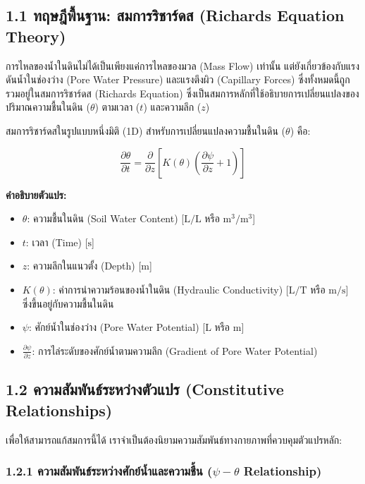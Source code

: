 \documentclass[11pt,a4paper,openany]{report}
\begin{document}
\subsection{1.1 ทฤษฎีพื้นฐาน: สมการริชาร์ดส (Richards Equation Theory)}


การไหลของน้ำในดินไม่ได้เป็นเพียงแค่การไหลของมวล (Mass Flow) เท่านั้น แต่ยังเกี่ยวข้องกับแรงดันน้ำในช่องว่าง (Pore Water Pressure) และแรงตึงผิว (Capillary Forces) ซึ่งทั้งหมดนี้ถูกรวมอยู่ในสมการริชาร์ดส (Richards Equation) ซึ่งเป็นสมการหลักที่ใช้อธิบายการเปลี่ยนแปลงของปริมาณความชื้นในดิน ($\theta$) ตามเวลา ($t$) และความลึก ($z$)

สมการริชาร์ดสในรูปแบบหนึ่งมิติ (1D) สำหรับการเปลี่ยนแปลงความชื้นในดิน ($\theta$) คือ:

$$\frac{\partial \theta}{\partial t} = \frac{\partial}{\partial z} \left[ K(\theta) \left( \frac{\partial \psi}{\partial z} + 1 \right) \right]$$


\textbf{คำอธิบายตัวแปร:}

\begin{itemize}
  \item $\theta$: ความชื้นในดิน (Soil Water Content) [$\text{L}/\text{L}$ หรือ $\text{m}^3/\text{m}^3$]
  \item $t$: เวลา (Time) [$\text{s}$]
  \item $z$: ความลึกในแนวตั้ง (Depth) [$\text{m}$]
  \item $K(\theta)$: ค่าการนำความร้อนของน้ำในดิน (Hydraulic Conductivity) [$\text{L}/\text{T}$ หรือ $\text{m}/\text{s}$] ซึ่งขึ้นอยู่กับความชื้นในดิน
  \item $\psi$: ศักย์น้ำในช่องว่าง (Pore Water Potential) [$\text{L}$ หรือ $\text{m}$]
  \item $\frac{\partial \psi}{\partial z}$: การไล่ระดับของศักย์น้ำตามความลึก (Gradient of Pore Water Potential)
\end{itemize}


\subsection{1.2 ความสัมพันธ์ระหว่างตัวแปร (Constitutive Relationships)}


เพื่อให้สามารถแก้สมการนี้ได้ เราจำเป็นต้องนิยามความสัมพันธ์ทางกายภาพที่ควบคุมตัวแปรหลัก:

\subsubsection{1.2.1 ความสัมพันธ์ระหว่างศักย์น้ำและความชื้น ($\psi - \theta$ Relationship)}
\end{document}
